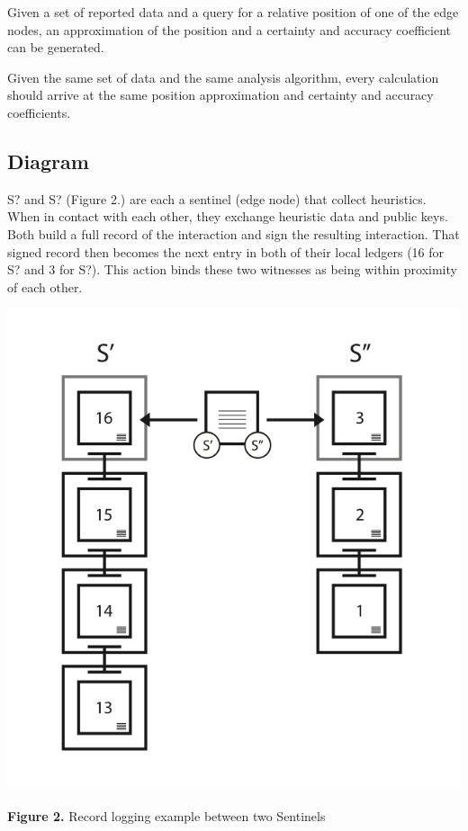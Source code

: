 \documentclass{article}
\begin{document}
Given a set of reported data and a query for a relative position of one of the edge nodes, an approximation of the position and a certainty and accuracy coefficient can be generated.

Given the same set of data and the same analysis algorithm, every calculation should arrive at the same position approximation and certainty and accuracy coefficients.

\subsection {Diagram}
S? and S? (Figure 2.) are each a \Gls{sentinel} (edge node) that collect \glspl{heuristic}. When in contact with each other, they exchange heuristic data and public keys. Both build a full record of the interaction and sign the resulting interaction. That signed record then becomes the next entry in both of their local ledgers (16 for S? and 3 for S?). This action binds these two witnesses as being within proximity of each other.

\includegraphics [width=\textwidth]{boundwitness}
\begin{center}\textbf{Figure 2.}  Record logging example between two Sentinels
\end{center}
\end{document}
